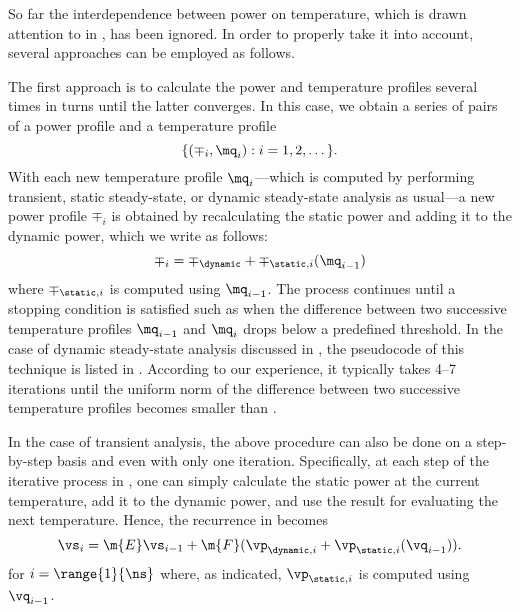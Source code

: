 So far the interdependence between power on temperature, which is drawn
attention to in , has been ignored. In order to properly take
it into account, several approaches can be employed as follows.

The first approach is to calculate the power and temperature profiles several
times in turns until the latter converges. In this case, we obtain a series of
pairs of a power profile and a temperature profile
\[
  \{ (\mp_i, \mq_i): i = 1, 2, \dots \}.
\]
With each new temperature profile $\mq_i$---which is computed by performing
transient, static steady-state, or dynamic steady-state analysis as usual---a
new power profile $\mp_i$ is obtained by recalculating the static power and
adding it to the dynamic power, which we write as follows:
\[
  \mp_i = \mp_\dynamic + \mp_{\static, i}(\mq_{i - 1})
\]
where $\mp_{\static, i}$ is computed using $\mq_{i - 1}$. The process continues
until a stopping condition is satisfied such as when the difference between two
successive temperature profiles $\mq_{i - 1}$ and $\mq_i$ drops below a
predefined threshold. In the case of dynamic steady-state analysis discussed in
, the pseudocode of this technique is listed
in . According to our experience, it
typically takes 4--7 iterations until the uniform norm of the difference between
two successive temperature profiles becomes smaller than .

In the case of transient analysis, the above procedure can also be done on a
step-by-step basis and even with only one iteration. Specifically, at each step
of the iterative process in , one can simply
calculate the static power at the current temperature, add it to the dynamic
power, and use the result for evaluating the next temperature. Hence, the
recurrence in  becomes
\[
  \vs_i = \m{E} \vs_{i - 1} + \m{F} (\vp_{\dynamic, i} + \vp_{\static, i}(\vq_{i - 1})).
\]
for $i = \range{1}{\ns}$ where, as indicated, $\vp_{\static, i}$ is computed
using $\vq_{i - 1}$.

